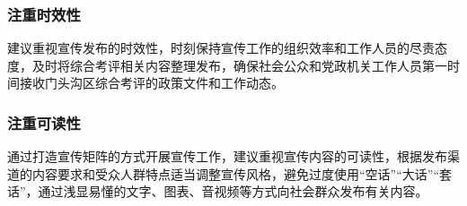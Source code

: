 \documentclass[12pt]{article} %
\begin{document}
\subsubsection{注重时效性}
建议重视宣传发布的时效性，时刻保持宣传工作的组织效率和工作人员的尽责态度，及时将综合考评相关内容整理发布，确保社会公众和党政机关工作人员第一时间接收门头沟区综合考评的政策文件和工作动态。

\subsubsection{注重可读性}
通过打造宣传矩阵的方式开展宣传工作，建议重视宣传内容的可读性，根据发布渠道的内容要求和受众人群特点适当调整宣传风格，避免过度使用“空话”“大话”“套话”，通过浅显易懂的文字、图表、音视频等方式向社会群众发布有关内容。
\end{document}
